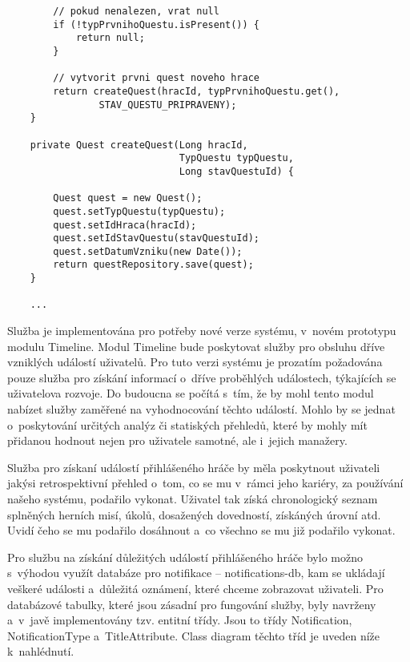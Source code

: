 \documentclass[12pt]{article}
\begin{document}
{\begin{lstlisting}
        // pokud nenalezen, vrat null
        if (!typPrvnihoQuestu.isPresent()) {
            return null;
        }

        // vytvorit prvni quest noveho hrace
        return createQuest(hracId, typPrvnihoQuestu.get(),
                STAV_QUESTU_PRIPRAVENY);
    }
    
    private Quest createQuest(Long hracId,
                              TypQuestu typQuestu,
                              Long stavQuestuId) {

        Quest quest = new Quest();
        quest.setTypQuestu(typQuestu);
        quest.setIdHraca(hracId);
        quest.setIdStavQuestu(stavQuestuId);
        quest.setDatumVzniku(new Date());
        return questRepository.save(quest);
    }
    
    ...

\end{lstlisting}

\clearpage


Služba je implementována pro potřeby nové verze systému, v~novém prototypu modulu Timeline. 
Modul Timeline bude poskytovat služby pro obsluhu dříve vzniklých událostí uživatelů.
Pro tuto verzi systému je prozatím požadována pouze služba pro získání informací o~dříve
proběhlých událostech, týkajících se uživatelova rozvoje.
Do budoucna se počítá s~tím, že by mohl tento modul nabízet služby zaměřené na vyhodnocování těchto událostí.
Mohlo by se jednat o~poskytování určitých analýz či statiských přehledů,
které by mohly mít přidanou hodnout nejen pro uživatele samotné, ale i~jejich manažery.

Služba pro získaní událostí přihlášeného hráče by měla poskytnout
uživateli jakýsi retrospektivní přehled o~tom,
co se mu v~rámci jeho kariéry, za používání našeho systému, podařilo vykonat.
Uživatel tak získá chronologický seznam splněných herních misí, úkolů,
dosažených dovedností, získáných úrovní atd.
Uvidí čeho se mu podařilo dosáhnout a~co všechno se mu již podařilo vykonat.


Pro službu na získání důležitých událostí přihlášeného hráče
bylo možno s~výhodou využít databáze pro notifikace -- notifications-db,
kam se ukládají veškeré události a~důležitá oznámení, které chceme zobrazovat uživateli.
Pro databázové tabulky, které jsou zásadní pro fungování služby, byly navrženy a~v~javě implementovány tzv. entitní třídy.
Jsou to třídy Notification, NotificationType a~TitleAttribute. 
Class diagram těchto tříd je uveden níže k~nahlédnutí.


}
\end{document}
